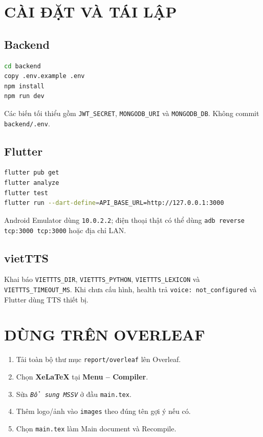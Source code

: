 \documentclass[12pt,a4paper,oneside]{report}
\newcommand{\studentTwoId}{\textit{Bổ sung MSSV}}
\begin{document}
\appendix
\chapter{CÀI ĐẶT VÀ TÁI LẬP}
\section{Backend}
\begin{lstlisting}[language=bash,caption={Khởi tạo backend}]
cd backend
copy .env.example .env
npm install
npm run dev
\end{lstlisting}
Các biến tối thiểu gồm \texttt{JWT\_SECRET}, \texttt{MONGODB\_URI} và
\texttt{MONGODB\_DB}. Không commit \texttt{backend/.env}.

\section{Flutter}
\begin{lstlisting}[language=bash,caption={Chạy và kiểm tra Flutter}]
flutter pub get
flutter analyze
flutter test
flutter run --dart-define=API_BASE_URL=http://127.0.0.1:3000
\end{lstlisting}
Android Emulator dùng \texttt{10.0.2.2}; điện thoại thật có thể dùng
\texttt{adb reverse tcp:3000 tcp:3000} hoặc địa chỉ LAN.

\section{vietTTS}
Khai báo \texttt{VIETTTS\_DIR}, \texttt{VIETTTS\_PYTHON},
\texttt{VIETTTS\_LEXICON} và \texttt{VIETTTS\_TIMEOUT\_MS}. Khi chưa cấu hình,
health trả \texttt{voice: not\_configured} và Flutter dùng TTS thiết bị.

\chapter{DÙNG TRÊN OVERLEAF}
\begin{enumerate}
 \item Tải toàn bộ thư mục \texttt{report/overleaf} lên Overleaf.
 \item Chọn \textbf{XeLaTeX} tại \textbf{Menu -- Compiler}.
 \item Sửa \texttt{\string\studentTwoId} ở đầu \texttt{main.tex}.
 \item Thêm logo/ảnh vào \texttt{images} theo đúng tên gợi ý nếu có.
 \item Chọn \texttt{main.tex} làm Main document và Recompile.
\end{enumerate}
\end{document}
